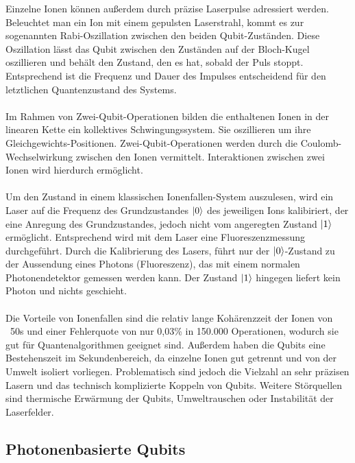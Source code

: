 Einzelne Ionen können außerdem durch präzise Laserpulse adressiert werden. Beleuchtet man ein Ion mit einem gepulsten Laserstrahl, kommt es zur sogenannten Rabi-Oszillation zwischen den beiden Qubit-Zuständen. Diese Oszillation lässt das Qubit zwischen den Zuständen auf der Bloch-Kugel oszillieren und behält den Zustand, den es hat, sobald der Puls stoppt. Entsprechend ist die Frequenz und Dauer des Impulses entscheidend für den letztlichen Quantenzustand des Systems. \cite{lapierre_introduction_2021} %
\\
\\
Im Rahmen von Zwei-Qubit-Operationen bilden die enthaltenen Ionen in der linearen Kette ein kollektives Schwingungssystem. Sie oszillieren um ihre Gleichgewichts-Positionen. Zwei-Qubit-Operationen werden durch die Coulomb-Wechselwirkung zwischen den Ionen vermittelt. Interaktionen zwischen zwei Ionen wird hierdurch ermöglicht. \cite{lapierre_introduction_2021} %
\\
\\
Um den Zustand in einem klassischen Ionenfallen-System auszulesen, wird ein Laser auf die Frequenz des Grundzustandes $\ket0$ des jeweiligen Ions kalibiriert, der eine Anregung des Grundzustandes, jedoch nicht vom angeregten Zustand $\ket1$ ermöglicht. Entsprechend wird mit dem Laser eine Fluoreszenzmessung durchgeführt. \cite{lapierre_introduction_2021}
Durch die Kalibrierung des Lasers, führt nur der $\ket0$-Zustand zu der Aussendung eines Photons (Fluoreszenz), das mit einem normalen Photonendetektor gemessen werden kann. Der Zustand $\ket1$ hingegen liefert kein Photon und nichts geschieht. \cite{lapierre_introduction_2021} %
\\
\\
Die Vorteile von Ionenfallen sind die relativ lange Kohärenzzeit der Ionen von ~50s und einer Fehlerquote von nur 0,03\% in 150.000 Operationen, wodurch sie gut für Quantenalgorithmen geeignet sind. \cite{kasirajan_fundamentals_2021}
Außerdem haben die Qubits eine Bestehenszeit im Sekundenbereich, da einzelne Ionen gut getrennt und von der Umwelt isoliert vorliegen. \cite{lapierre_introduction_2021}
Problematisch sind jedoch die Vielzahl an sehr präzisen Lasern und das technisch komplizierte Koppeln von Qubits. Weitere Störquellen sind thermische Erwärmung der Qubits, Umweltrauschen oder Instabilität der Laserfelder. \cite{kasirajan_fundamentals_2021} %


\subsection{Photonenbasierte Qubits}

